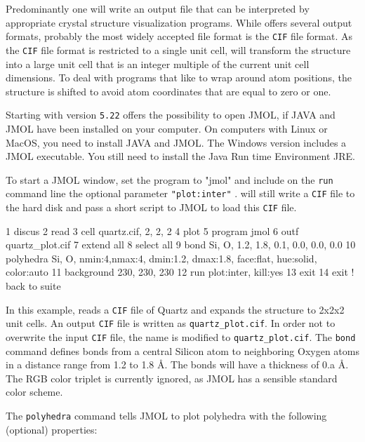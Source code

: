 Predominantly one will write an output file that can be interpreted 
by appropriate crystal structure visualization programs. While 
\Discus offers several output formats, probably the most widely accepted
file format is the {\tt CIF} file format. As the {\tt CIF} file 
format is restricted to a single unit cell, \Discus will transform the
structure into a large unit cell that is an integer multiple of the current  
unit cell dimensions. To deal with programs that like to wrap around
atom positions, the structure is shifted to avoid atom coordinates that
are equal to zero or one.

Starting with version {\tt 5.22} \Discus offers the possibility to
open JMOL, if JAVA and JMOL have been installed on your computer. 
On computers with Linux or MacOS, you need to install JAVA and JMOL. 
The Windows version includes a JMOL executable. You still need to 
install the Java Run time Environment JRE. 

To start a JMOL window, set the program to "jmol" and include 
on the {\tt run} command line
the optional parameter {\tt "plot:inter"} 
. \Discus will still write a {\tt CIF} file to 
the hard disk and pass a short script to JMOL to load this {\tt CIF} file.

\begin{MacVerbatim}
 1  discus
 2  read
 3    cell quartz.cif, 2, 2, 2
 4  plot
 5    program   jmol
 6    outf      quartz_plot.cif
 7    extend    all
 8    select    all
 9    bond      Si, O, 1.2, 1.8, 0.1, 0.0, 0.0, 0.0
10    polyhedra Si, O, nmin:4,nmax:4, dmin:1.2, dmax:1.8, face:flat, hue:solid, color:auto
11    background 230, 230, 230
12    run plot:inter, kill:yes
13  exit
14  exit  ! back to suite
\end{MacVerbatim}

In this example, \Discus reads a {\tt CIF} file of Quartz and expands the 
structure to 2x2x2 unit cells. An output {\tt CIF} file is written as
{\tt quartz\_plot.cif}. In order not to overwrite the input {\tt CIF} file,
the name is modified to {\tt quartz\_plot.cif}. The {\tt bond} command
defines bonds from a central Silicon atom to neighboring Oxygen atoms
in a distance range from 1.2 to 1.8 \AA{}. The bonds will have a thickness
of 0.a \AA. The RGB color triplet is currently ignored, as JMOL has a
sensible standard color scheme. 

The {\tt polyhedra} command tells JMOL to plot polyhedra with the 
following (optional) properties:

